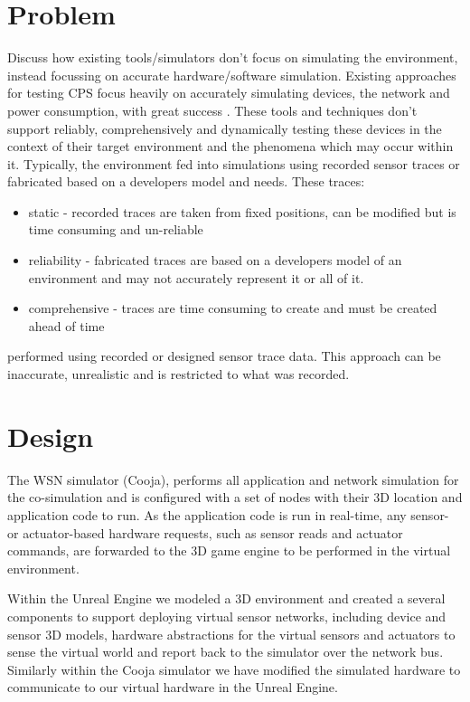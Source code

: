 \section{Problem} %
\label{sec:problem}
Discuss how existing tools/simulators don't focus on simulating the environment, instead focussing on accurate hardware/software simulation. 
Existing approaches for testing CPS focus heavily on accurately simulating devices, the network and power consumption, with great success \cite{cooja, tossim}.
These tools and techniques don't support reliably, comprehensively and dynamically testing these devices in the context of their target environment and the phenomena which may occur within it. Typically, the environment fed into simulations using recorded sensor traces or fabricated based on a developers model and needs. These traces:
\begin{itemize}
  \item static - recorded traces are taken from fixed positions, can be modified but is time consuming and un-reliable
  \item reliability - fabricated traces are based on a developers model of an environment and may not accurately represent it or all of it.
  \item comprehensive - traces are time consuming to create and must be created ahead of time
\end{itemize}

performed using recorded or designed sensor trace data. This approach can be inaccurate, unrealistic and is restricted to what was recorded.

\section{Design}
\label{sec:Design}

The WSN simulator (Cooja), performs all application and network simulation for the co-simulation and is configured with a set of nodes with their 3D location and application code to run. As the application code is run in real-time, any sensor- or actuator-based hardware requests, such as sensor reads and actuator commands, are forwarded to the 3D game engine to be performed in the virtual environment.

Within the Unreal Engine we modeled a 3D environment and created a several components to support deploying virtual sensor networks, including device and sensor 3D models, hardware abstractions for the virtual sensors and actuators to sense the virtual world and report back to the simulator over the network bus. Similarly within the Cooja simulator we have modified the simulated hardware to communicate to our virtual hardware in the Unreal Engine.

